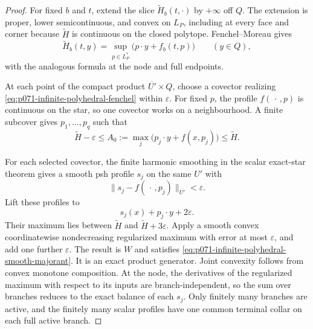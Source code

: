 \begin{proof}
For fixed \(b\) and \(t\), extend the slice
\(\widetilde H_b(t,\cdot)\) by \(+\infty\) off \(Q\).  The extension is
proper, lower semicontinuous, and convex on \(L_P\), including at every face
and corner because \(\widetilde H\) is continuous on the closed polytope.
Fenchel--Moreau gives
\begin{equation}
 \widetilde H_b(t,y)=
       \sup_{p\in L_P^*}\bigl(p\mathbin\cdot y+f_b(t,p)\bigr)
 \qquad(y\in Q),
 \label{eq:p071-infinite-polyhedral-fenchel}
\end{equation}
with the analogous formula at the node and full endpoints.

At each point of the compact product
\(\overline{U'}\times Q\), choose a covector realizing
\eqref{eq:p071-infinite-polyhedral-fenchel} within \(\varepsilon\).
For fixed \(p\), the profile \(f(\,\cdot\,,p)\) is continuous on the star,
so one covector works on a neighbourhood.  A finite subcover gives
\(p_1,\ldots,p_q\) such that
\begin{equation}
 \widetilde H-\varepsilon\leq
 A_0:=\max_j\bigl(p_j\mathbin\cdot y+f(x,p_j)\bigr)
 \leq\widetilde H.
 \label{eq:p071-infinite-polyhedral-finite-dual-sampling}
\end{equation}

For each selected covector, the finite harmonic smoothing in the scalar
exact-star theorem gives a smooth psh profile \(s_j\) on the same \(U'\)
with
\[
             \lVert s_j-f(\,\cdot\,,p_j)\rVert_{\overline{U'}}
                    <\varepsilon.
\]
Lift these profiles to
\[
               s_j(x)+p_j\mathbin\cdot y+2\varepsilon.
\]
Their maximum lies between \(\widetilde H\) and
\(\widetilde H+3\varepsilon\).  Apply a smooth convex coordinatewise
nondecreasing regularized maximum with error at most \(\varepsilon\), and
add one further \(\varepsilon\).  The result is \(W\) and satisfies
\eqref{eq:p071-infinite-polyhedral-smooth-majorant}.  It is an exact product
generator.  Joint convexity follows from convex monotone composition.  At
the node, the derivatives of the regularized maximum with respect to its
inputs are branch-independent, so the sum over branches reduces to the
exact balance of each \(s_j\).  Only finitely many branches are active, and
the finitely many scalar profiles have one common terminal collar on each
full active branch.


\end{proof}
